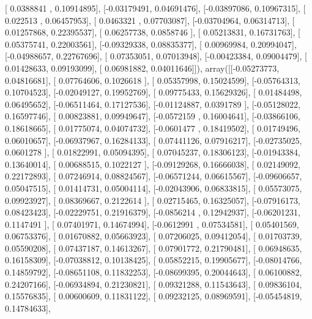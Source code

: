 \documentclass{article}
\begin{document}
       [ 0.0388841 ,  0.10914895],
       [-0.03179491,  0.04691476],
       [-0.03897086,  0.10967315],
       [ 0.022513  ,  0.06457953],
       [ 0.0463321 ,  0.07703087],
       [-0.03704964,  0.06314713],
       [ 0.01257868,  0.22395537],
       [ 0.06257738,  0.0858746 ],
       [ 0.05213831,  0.16731763],
       [ 0.05375741,  0.22003561],
       [-0.09329338,  0.08835377],
       [ 0.00969984,  0.20994047],
       [-0.04988657,  0.22767696],
       [ 0.07353051,  0.07013948],
       [-0.00423384,  0.09004479],
       [ 0.01428633,  0.09193099],
       [ 0.06981882,  0.04011646]]), array([[-0.05273773,  0.04816681],
       [ 0.07764606,  0.1026618 ],
       [ 0.05357998,  0.15024599],
       [-0.05764313,  0.10704523],
       [-0.02049127,  0.19952769],
       [ 0.09775433,  0.15629326],
       [ 0.01484498,  0.06495652],
       [-0.06511464,  0.17127536],
       [-0.01124887,  0.0391789 ],
       [-0.05128022,  0.16597746],
       [ 0.00823881,  0.09949647],
       [-0.0572159 ,  0.16004641],
       [-0.03866106,  0.18618665],
       [ 0.01775074,  0.04074732],
       [-0.0601477 ,  0.18419502],
       [ 0.01749496,  0.06010657],
       [-0.06937967,  0.16284133],
       [ 0.07441126,  0.07916217],
       [-0.02735025,  0.0601278 ],
       [ 0.01822991,  0.05094395],
       [ 0.07045237,  0.18306123],
       [-0.01943384,  0.13640014],
       [ 0.00688515,  0.1022127 ],
       [-0.09129268,  0.16666038],
       [ 0.02149092,  0.22172893],
       [ 0.07246914,  0.08824567],
       [-0.06571244,  0.06615567],
       [-0.09606657,  0.05047515],
       [ 0.01414731,  0.05004114],
       [-0.02043906,  0.06833815],
       [ 0.05573075,  0.09923927],
       [ 0.08369667,  0.2122614 ],
       [ 0.02715465,  0.16325057],
       [-0.07916173,  0.08423423],
       [-0.02229751,  0.21916379],
       [-0.0856214 ,  0.12942937],
       [-0.06201231,  0.1147491 ],
       [ 0.07401971,  0.14674994],
       [-0.0612991 ,  0.07534581],
       [ 0.05401569,  0.06753376],
       [ 0.01670882,  0.05663923],
       [ 0.07206025,  0.09412054],
       [ 0.01703739,  0.05590208],
       [ 0.07437187,  0.14613267],
       [ 0.07901772,  0.21790481],
       [ 0.06948635,  0.16158309],
       [-0.07038812,  0.10138425],
       [ 0.05852215,  0.19905677],
       [-0.08014766,  0.14859792],
       [-0.08651108,  0.11832253],
       [-0.08699395,  0.20044643],
       [ 0.06100882,  0.24207166],
       [-0.06934894,  0.21230821],
       [ 0.09321288,  0.11543643],
       [ 0.09836104,  0.15576835],
       [ 0.00600609,  0.11831122],
       [ 0.09232125,  0.08969591],
       [-0.05454819,  0.14784633],
\end{document}
